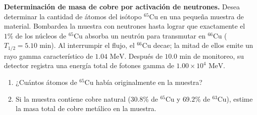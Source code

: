 \item \textbf{Determinación de masa de cobre por activación de neutrones.}
Desea determinar la cantidad de átomos del isótopo $^{65}\text{Cu}$ en una pequeña muestra de material. Bombardea la muestra con neutrones hasta lograr que exactamente el $1\%$ de los núcleos de $^{65}\text{Cu}$ absorba un neutrón para transmutar en $^{66}\text{Cu}$ ($T_{1/2} = 5.10\text{ min}$). Al interrumpir el flujo, el $^{66}\text{Cu}$ decae; la mitad de ellos emite un rayo gamma característico de $1.04\text{ MeV}$. Después de $10.0\text{ min}$ de monitoreo, su detector registra una energía total de fotones gamma de $1.00 \times 10^4\text{ MeV}$.
\begin{enumerate}
    \item ¿Cuántos átomos de $^{65}\text{Cu}$ había originalmente en la muestra?
    \item Si la muestra contiene cobre natural ($30.8\%$ de $^{65}\text{Cu}$ y $69.2\%$ de $^{63}\text{Cu}$), estime la masa total de cobre metálico en la muestra.
\end{enumerate}